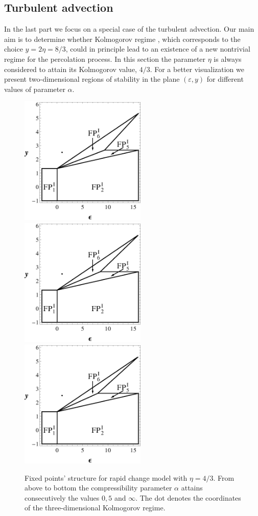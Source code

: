\documentclass[aps,pre,url,twocolumn,superscriptaddress]{revtex4-1}
\def\eps{\varepsilon}
\begin{document}
\subsection{Turbulent advection \label{subsec:turbulent}}
In the last part we focus on a special case of the turbulent advection.
Our main aim is to determine whether Kolmogorov regime \cite{Frisch}, which
corresponds to the choice $y=2\eta=8/3$, could in principle lead to an existence of a new
nontrivial regime for the percolation process.
In this section the parameter $\eta$ is always considered to attain its Kolmogorov value, $4/3$.
For a better visualization we present two-dimensional regions of stability
in the plane $(\eps,y)$ for different values of parameter $\alpha$.
\begin{figure}[h!]
  \includegraphics[width=6cm]{RCHM_0.eps} 
  \includegraphics[width=6cm]{RCHM_5.eps}
  \includegraphics[width=6cm]{RCHM_Alpha_Infinity.eps}  
  \caption{  
  Fixed points' structure for rapid change model with $\eta=4/3$. 
	From above to bottom the compressibility parameter $\alpha$ attains
	consecutively the values $0,5$ and $\infty$. The dot denotes the coordinates of the
	three-dimensional Kolmogorov regime.}
  \label{fig:rapid}	
\end{figure}
\end{document}
